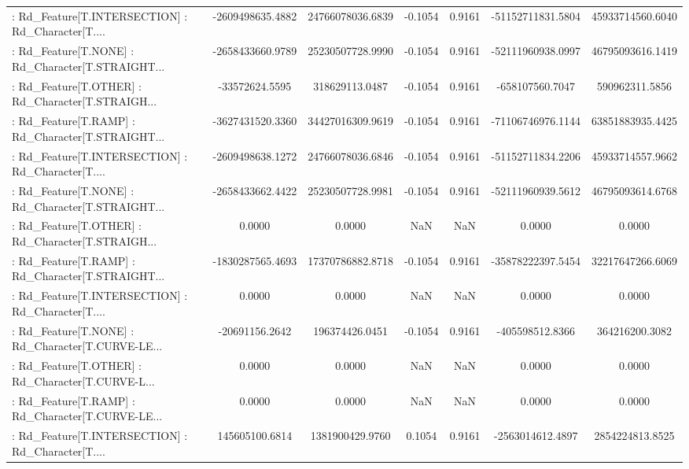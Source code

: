 \begin{longtable}{p{4cm}cccccc}
 : Rd\_Feature[T.INTERSECTION] : Rd\_Character[T.... &  -2609498635.4882 &  24766078036.6839 & -0.1054 &       0.9161 &  -51152711831.5804 &  45933714560.6040 \\
 : Rd\_Feature[T.NONE] : Rd\_Character[T.STRAIGHT... &  -2658433660.9789 &  25230507728.9990 & -0.1054 &       0.9161 &  -52111960938.0997 &  46795093616.1419 \\
 : Rd\_Feature[T.OTHER] : Rd\_Character[T.STRAIGH... &    -33572624.5595 &    318629113.0487 & -0.1054 &       0.9161 &    -658107560.7047 &    590962311.5856 \\
 : Rd\_Feature[T.RAMP] : Rd\_Character[T.STRAIGHT... &  -3627431520.3360 &  34427016309.9619 & -0.1054 &       0.9161 &  -71106746976.1144 &  63851883935.4425 \\
 : Rd\_Feature[T.INTERSECTION] : Rd\_Character[T.... &  -2609498638.1272 &  24766078036.6846 & -0.1054 &       0.9161 &  -51152711834.2206 &  45933714557.9662 \\
 : Rd\_Feature[T.NONE] : Rd\_Character[T.STRAIGHT... &  -2658433662.4422 &  25230507728.9981 & -0.1054 &       0.9161 &  -52111960939.5612 &  46795093614.6768 \\
 : Rd\_Feature[T.OTHER] : Rd\_Character[T.STRAIGH... &            0.0000 &            0.0000 &     NaN &          NaN &             0.0000 &            0.0000 \\
 : Rd\_Feature[T.RAMP] : Rd\_Character[T.STRAIGHT... &  -1830287565.4693 &  17370786882.8718 & -0.1054 &       0.9161 &  -35878222397.5454 &  32217647266.6069 \\
 : Rd\_Feature[T.INTERSECTION] : Rd\_Character[T.... &            0.0000 &            0.0000 &     NaN &          NaN &             0.0000 &            0.0000 \\
 : Rd\_Feature[T.NONE] : Rd\_Character[T.CURVE-LE... &    -20691156.2642 &    196374426.0451 & -0.1054 &       0.9161 &    -405598512.8366 &    364216200.3082 \\
 : Rd\_Feature[T.OTHER] : Rd\_Character[T.CURVE-L... &            0.0000 &            0.0000 &     NaN &          NaN &             0.0000 &            0.0000 \\
 : Rd\_Feature[T.RAMP] : Rd\_Character[T.CURVE-LE... &            0.0000 &            0.0000 &     NaN &          NaN &             0.0000 &            0.0000 \\
 : Rd\_Feature[T.INTERSECTION] : Rd\_Character[T.... &    145605100.6814 &   1381900429.9760 &  0.1054 &       0.9161 &   -2563014612.4897 &   2854224813.8525 \\

\end{longtable}
